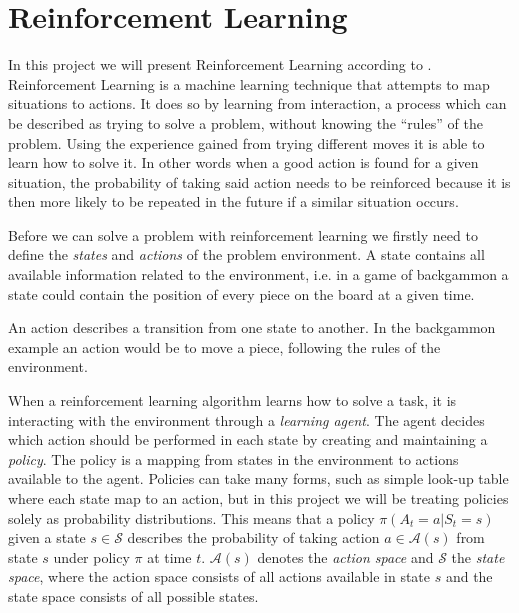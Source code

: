 \documentclass[11pt]{article}
\begin{document}
\maketitle

\section{Reinforcement Learning}

In this project we will present Reinforcement Learning according to
\cite{RLbook}.
Reinforcement Learning is a machine learning technique that attempts 
to map situations to actions.
It does so by learning from interaction, a process which can be described as trying to solve a problem,
without knowing the “rules” of the problem.
Using the experience gained from trying different moves it is able to learn how to solve it.
In other words when a good action is found for a given situation,
the probability of taking said action needs to be reinforced because it is then more likely to be
repeated in the future if a similar situation occurs.

Before we can solve a problem with reinforcement learning we firstly need to define
the \textit{states} and \textit{actions} of the problem environment.
A state contains all available information related to the environment,
i.e. in a game of backgammon a state could contain the position of every piece on the board at
a given time.

An action describes a transition from one state to another.
In the backgammon example an action would be to move a piece, following the rules of the
environment.

When a reinforcement learning algorithm learns how to solve a task, it is
interacting with the environment through a \textit{learning agent}.
The agent decides which action should be performed in each state by creating and maintaining a \textit{policy}.
The policy is a mapping from states in the environment to actions available to the agent.
Policies can take many forms, such as simple look-up table where each state map to an
action, but in this project we will be treating policies solely as probability distributions.
This means that a policy $\pi(A_t = a|S_t = s)$ given a state $s \in \mathcal{S}$ describes the
probability of taking action $a \in \mathcal{A}(s)$ from state $s$ under policy $\pi$ at time $t$.
$\mathcal{A}(s)$ denotes the \textit{action space} and $\mathcal{S}$ the \textit{state space},
where the action space consists of all actions available in state $s$ and the state space consists of
all possible states.
\end{document}
